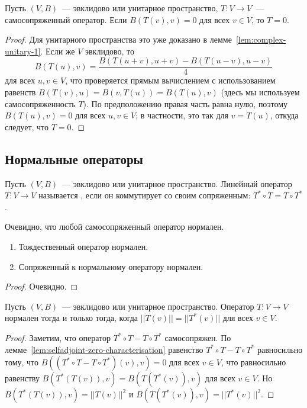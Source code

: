 \begin{lemma}\label{lem:selfadjoint-zero-characterisation}
Пусть $(V,B)$~--- эвклидово или унитарное пространство,
$T\colon V\to V$~--- самосопряженный оператор.
Если $B(T(v),v) = 0$ для всех $v\in V$, то $T=0$.
\end{lemma}
\begin{proof}
Для унитарного пространства это уже доказано
в лемме~\ref{lem:complex-unitary-1}. Если же $V$ эвклидово, то
$$
B(T(u),v) = \frac{B(T(u+v),u+v) - B(T(u-v),u-v)}{4}
$$
для всех $u,v\in V$,
что проверяется прямым вычислением с использованием
равенств $B(T(v),u) = B(v,T(u)) = B(T(u),v)$
(здесь мы используем самосопряженность $T$).
По предположению правая часть равна нулю, поэтому
$B(T(u),v)=0$ для всех $u,v\in V$; в частности, это так
для $v = T(u)$, откуда следует, что $T=0$.
\end{proof}

\subsection{Нормальные операторы}


\begin{definition}
Пусть $(V,B)$~--- эвклидово или унитарное пространство.
Линейный оператор $T\colon V\to V$ называется
, если он коммутирует со
своим сопряженным: $T^*\circ T = T\circ T^*$.
\end{definition}

\begin{remark}
Очевидно, что любой самосопряженный оператор нормален.
\end{remark}

\begin{lemma}
\begin{enumerate}
\item Тождественный оператор нормален.
\item Сопряженный к нормальному оператору нормален.
\end{enumerate}
\end{lemma} 
\begin{proof}
Очевидно.
\end{proof}

\begin{lemma}\label{prop:normal-operator-equiv}
Пусть $(V,B)$~--- эвклидово или унитарное пространство.
Оператор $T\colon V\to V$ нормален тогда и только тогда, когда
$||T(v)|| = ||T^*(v)||$ для всех $v\in V$.
\end{lemma}
\begin{proof}
Заметим, что оператор $T^*\circ T - T\circ T^*$ самосопряжен.
По лемме~\ref{lem:selfadjoint-zero-characterisation}
равенство $T^*\circ T - T\circ T^*$ равносильно тому,
что $B((T^*\circ T - T\circ T^*)(v),v) = 0$ для всех $v\in V$,
что равносильно равенству
$B(T^*(T(v)),v) = B(T(T^*(v)),v)$ для всех $v\in V$.
Но $B(T^*(T(v)),v) = ||T(v)||^2$ и $B(T(T^*(v)),v) = ||T^*(v)||^2$.
\end{proof}

